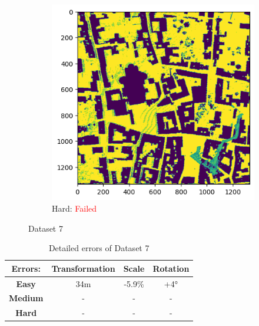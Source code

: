 \documentclass[11pt]{article}
\begin{document}
\begin{figure}[p]
        \vspace{1em}

        \begin{subfigure}{0.45\textwidth}
            \centering
            \includegraphics[width=\linewidth]{images/full/hard/5_2_4_hard}
            \caption{Hard: \textcolor{red}{Failed}}
            \label{fig:5_2_4_hard}
        \end{subfigure}
        \hfill

        \caption{Dataset 7}
        \label{fig:res_5_2_4}
    \end{figure}

    \begin{table}[p]
        \centering
        \begin{tabular}{|c|c|c|c|}
          \hline
          \textbf{Errors:} & \textbf{Transformation} & \textbf{Scale} & \textbf{Rotation} \\
          \hline
          \textbf{Easy}   & 34m  & -5.9\% & +4° \\
          \hline
          \textbf{Medium} & -  & - & - \\
          \hline
          \textbf{Hard}   & -  & - & - \\
          \hline
        \end{tabular}
        \caption{Detailed errors of Dataset 7}
        \label{tab:tab_7}
    \end{table}
\end{document}
